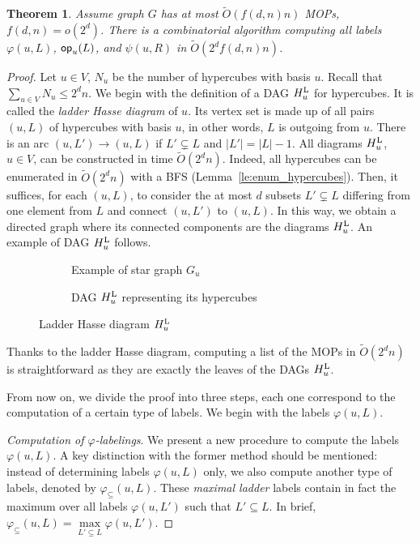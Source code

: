 \documentclass{article}
\newtheorem{theorem}{Theorem}
\newcommand{\card}[1]{\left| #1 \right|}
\newcommand{\opp}{\mbox{\textsf{op}}}
\newcommand{\hul}{H_u^{\mbox{\scriptsize{L}}}}
\newcommand{\varphis}{\varphi_{\subseteq}}
\begin{document}
\begin{theorem}
Assume graph $G$ has at most $\tilde{O}(f(d,n)n)$ MOPs, $f(d,n) = o(2^d)$. There is a combinatorial algorithm computing all labels $\varphi(u,L)$, $\opp_u(L)$, and $\psi(u,R)$ in $\tilde{O}(2^df(d,n)n)$.
\label{th:labels_mops}
\end{theorem}
\begin{proof}
Let $u \in V$, $N_u$ be the number of hypercubes with basis $u$. 
Recall that $\sum_{u \in V} N_u \le 2^dn$. We begin with the definition of a DAG $\hul$ for hypercubes. It is called the \textit{ladder Hasse diagram} of $u$. Its vertex set is made up of all pairs $(u,L)$ of hypercubes with basis $u$, in other words, $L$ is outgoing from $u$. There is an arc $(u,L')\rightarrow (u,L)$ if $L' \subsetneq L$ and $\card{L'} = \card{L} - 1$. All diagrams $\hul$, $u \in V$, can be constructed in time $\tilde{O}(2^dn)$. Indeed, all hypercubes can be enumerated in $\tilde{O}(2^dn)$ with a BFS (Lemma~\ref{le:enum_hypercubes}). Then, it suffices, for each $(u,L)$, to consider the at most $d$ subsets $L' \subsetneq L$ differing from one element from $L$ and connect $(u,L')$ to $(u,L)$. In this way, we obtain a directed graph where its connected components are the diagrams $\hul$. An example of DAG $\hul$ follows.

\begin{figure}[h]
\centering
\begin{subfigure}[b]{0.49\columnwidth}
\centering
\scalebox{0.9}{}
\caption{Example of star graph $G_u$}
\label{subfig:two_cubes}
\end{subfigure}
\begin{subfigure}[b]{0.49\columnwidth}
\centering
\scalebox{0.9}{}
\caption{DAG $\hul$ representing its hypercubes}
\label{subfig:hul}
\end{subfigure}

\caption{Ladder Hasse diagram $\hul$}
\label{fig:hul}
\end{figure}

Thanks to the ladder Hasse diagram, computing a list of the MOPs in $\tilde{O}(2^dn)$ is straightforward as they are exactly the leaves of the DAGs $\hul$.

From now on, we divide the proof into three steps, each one correspond to the computation of a certain type of labels. We begin with the labels $\varphi(u,L)$. 

\textit{Computation of $\varphi$-labelings}. 
We present a new procedure to compute the labels $\varphi(u,L)$. A key distinction with the former method should be mentioned: instead of determining labels $\varphi(u,L)$ only, we also compute another type of labels, denoted by $\varphis(u,L)$. These \textit{maximal ladder} labels contain in fact the maximum over all labels $\varphi(u,L')$ such that $L' \subseteq L$. In brief, $\varphis(u,L) = \max\limits_{L' \subseteq L} \varphi(u,L')$.


\end{proof}
\end{document}
